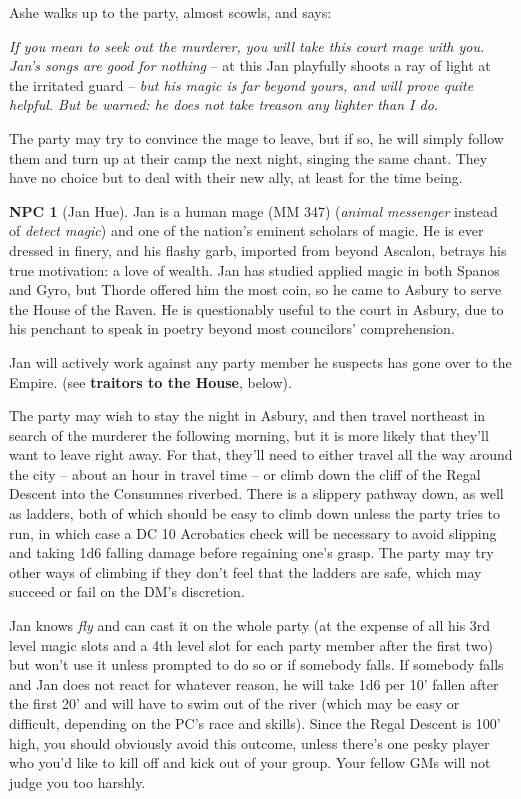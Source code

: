 \documentclass{report}
\theoremstyle{definition}
\newtheorem{npc}{NPC}[chapter]
\begin{document}
Ashe walks up to the party, almost scowls, and says:

\begin{displayquote}
\textit{If you mean to seek out the murderer, you will take this court mage with you. Jan's songs are good for nothing} -- at this Jan playfully shoots a ray of light at the irritated guard -- \textit{but his magic is far beyond yours, and will prove quite helpful. But be warned: he does not take treason any lighter than I do.}
\end{displayquote}

The party may try to convince the mage to leave, but if so, he will simply follow them and turn up at their camp the next night, singing the same chant. They have no choice but to deal with their new ally, at least for the time being.

\begin{npc}[Jan Hue]
Jan is a human mage (MM 347) (\textit{animal messenger} instead of \textit{detect magic}) and one of the nation's eminent scholars of magic. He is ever dressed in finery, and his flashy garb, imported from beyond Ascalon, betrays his true motivation: a love of wealth. Jan has studied applied magic in both Spanos and Gyro, but Thorde offered him the most coin, so he came to Asbury to serve the House of the Raven. He is questionably useful to the court in Asbury, due to his penchant to speak in poetry beyond most councilors' comprehension.

Jan will actively work against any party member he suspects has gone over to the Empire. (see \textbf{traitors to the House}, below).
\end{npc}

The party may wish to stay the night in Asbury, and then travel northeast in search of the murderer the following morning, but it is more likely that they'll want to leave right away. For that, they'll need to either travel all the way around the city -- about an hour in travel time -- or climb down the cliff of the Regal Descent into the Consumnes riverbed. There is a slippery pathway down, as well as ladders, both of which should be easy to climb down unless the party tries to run, in which case a DC 10 Acrobatics check will be necessary to avoid slipping and taking 1d6 falling damage before regaining one's grasp. The party may try other ways of climbing if they don't feel that the ladders are safe, which may succeed or fail on the DM's discretion.

Jan knows \textit{fly} and can cast it on the whole party (at the expense of all his 3rd level magic slots and a 4th level slot for each party member after the first two) but won't use it unless prompted to do so or if somebody falls. If somebody falls and Jan does not react for whatever reason, he will take 1d6 per 10' fallen after the first 20' and will have to swim out of the river (which may be easy or difficult, depending on the PC's race and skills). Since the Regal Descent is 100' high, you should obviously avoid this outcome, unless there's one pesky player who you'd like to kill off and kick out of your group. Your fellow GMs will not judge you too harshly.
\end{document}
